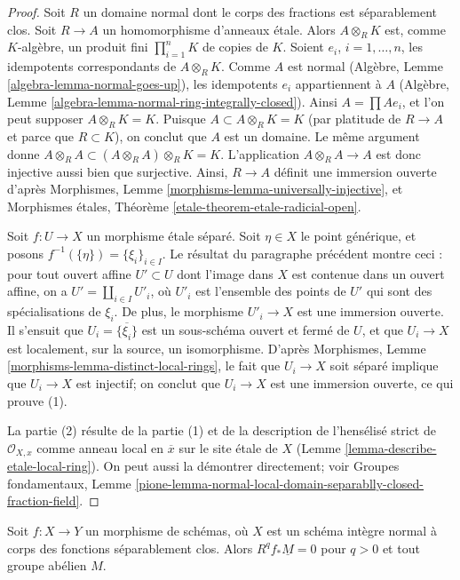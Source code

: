 \begin{proof}
Soit $R$ un domaine normal dont le corps des fractions est séparablement
clos. Soit $R \to A$ un homomorphisme d'anneaux étale. Alors
$A \otimes_R K$ est, comme $K$-algèbre, un produit fini
$\prod_{i=1}^n K$ de copies de $K$. Soient $e_i$, $i = 1, \ldots, n$,
les idempotents correspondants de $A \otimes_R K$. Comme $A$ est normal
(Algèbre, Lemme \ref{algebra-lemma-normal-goes-up}),
les idempotents $e_i$ appartiennent à $A$
(Algèbre, Lemme \ref{algebra-lemma-normal-ring-integrally-closed}).
Ainsi $A = \prod Ae_i$, et l'on peut supposer $A \otimes_R K = K$.
Puisque $A \subset A \otimes_R K = K$ (par platitude de $R \to A$ et
parce que $R \subset K$), on conclut que $A$ est un domaine.
Le même argument donne
$A \otimes_R A \subset (A \otimes_R A) \otimes_R K = K$.
L'application $A \otimes_R A \to A$ est donc
injective aussi bien que surjective. Ainsi, $R \to A$ définit une
immersion ouverte d'après
Morphismes, Lemme \ref{morphisms-lemma-universally-injective},
et
Morphismes étales, Théorème \ref{etale-theorem-etale-radicial-open}.

\medskip\noindent
Soit $f : U \to X$ un morphisme étale séparé. Soit $\eta \in X$
le point générique, et posons $f^{-1}(\{\eta\}) = \{\xi_i\}_{i \in I}$.
Le résultat du paragraphe précédent montre ceci :
pour tout ouvert affine $U' \subset U$ dont l'image dans $X$ est contenue dans
un ouvert affine, on a $U' = \coprod_{i \in I} U'_i$, où $U'_i$
est l'ensemble des points de $U'$ qui sont des spécialisations de $\xi_i$.
De plus, le morphisme $U'_i \to X$ est une immersion ouverte.
Il s'ensuit que $U_i = \overline{\{\xi_i\}}$ est un sous-schéma ouvert et fermé
de $U$, et que $U_i \to X$ est localement, sur la source,
un isomorphisme. D'après Morphismes,
Lemme \ref{morphisms-lemma-distinct-local-rings},
le fait que $U_i \to X$ soit séparé implique que
$U_i \to X$ est injectif; on conclut que $U_i \to X$
est une immersion ouverte, ce qui prouve (1).

\medskip\noindent
La partie (2) résulte de la partie (1) et de la description de l'hensélisé
strict de $\mathcal{O}_{X, x}$ comme anneau local en $\overline{x}$
sur le site étale de $X$ (Lemme \ref{lemma-describe-etale-local-ring}).
On peut aussi la démontrer directement; voir
Groupes fondamentaux, Lemme
\ref{pione-lemma-normal-local-domain-separablly-closed-fraction-field}.
\end{proof}

\begin{lemma}
\label{lemma-Rf-star-zero-normal-with-alg-closed-function-field}
Soit $f : X \to Y$ un morphisme de schémas, où $X$ est un schéma intègre
normal à corps des fonctions séparablement clos. Alors
$R^qf_*\underline{M} = 0$ pour $q > 0$ et tout groupe abélien $M$.
\end{lemma}

